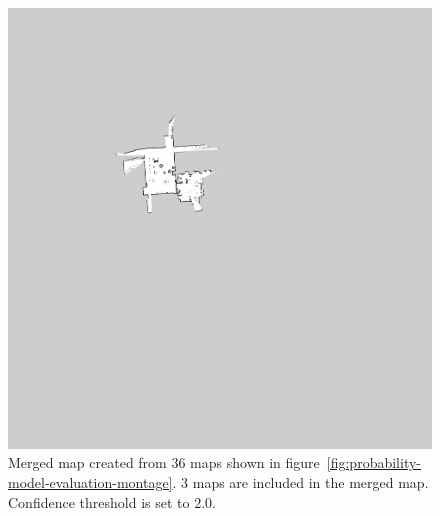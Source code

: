 \begin{figure}
    \centering
    \includegraphics[width=\textwidth]{../img/probability-model-evaluation-treshold_2_0-3maps.png}
    \caption[The merged map created with confidence threshold $2.0$.]{Merged map created from $36$ maps shown in figure~\ref{fig:probability-model-evaluation-montage}. $3$ maps are included in the merged map. Confidence threshold is set to $2.0$.}
    \label{fig:probability-model-evaluation-treshold_2.0-3maps}
\end{figure}

